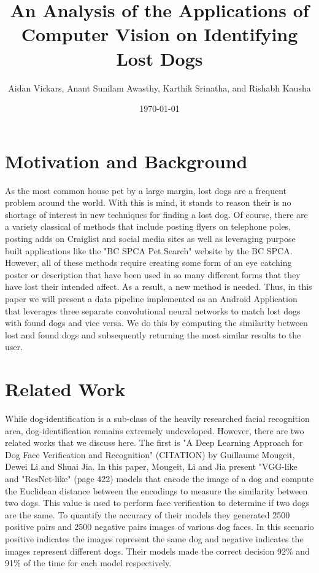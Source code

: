 \documentclass{article}
\title{An Analysis of the Applications of Computer Vision on Identifying Lost Dogs}
\author{Aidan Vickars, Anant Sunilam Awasthy, Karthik Srinatha, and Rishabh Kausha}
\date{\today}
\begin{document}
\maketitle

\newpage
\section{Motivation and Background}
As the most common house pet by a large margin, lost dogs are a frequent problem around the world.  With this is mind, it stands to reason their is no shortage of interest in new techniques for finding a lost dog.  Of course, there are a variety classical of methods that include posting flyers on telephone poles, posting adds on Craiglist and social media sites as well as leveraging purpose built applications like the "BC SPCA Pet Search" website by the BC SPCA.  However, all of these methods require creating some form of an eye catching poster or description that have been used in so many different forms that they have lost their intended affect.  As a result, a new method is needed.  Thus, in this paper we will present a data pipeline implemented as an Android Application that leverages three separate convolutional neural networks to match lost dogs with found dogs and vice versa.  We do this by computing the similarity between lost and found dogs and subsequently returning the most similar results to the user.

\section{Related Work}
	While dog-identification is a sub-class of the heavily researched facial recognition area, dog-identification remains extremely undeveloped.  However, there are two related works that we discuss here.  The first is "A Deep Learning Approach for Dog Face Verification and Recognition" (CITATION)  by  Guillaume Mougeit, Dewei Li and Shuai Jia.  In this paper, Mougeit, Li and Jia present "VGG-like and "ResNet-like" (page 422) models that encode the image of a dog and compute the Euclidean distance between the encodings to measure the similarity between two dogs.  This value is used to perform face verification to determine if two dogs are the same.  To quantify the accuracy of their models they generated 2500 positive pairs and 2500 negative pairs images of various dog faces.  In this scenario positive indicates the images represent the same dog and negative indicates the images represent different dogs.  Their models made the correct decision 92\% and 91\% of the time for each model respectively.
\end{document}
